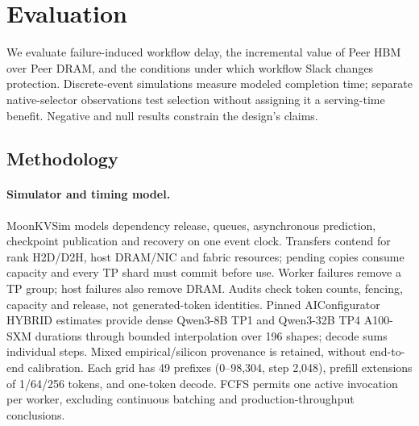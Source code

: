 \section{Evaluation}
\label{sec:evaluation}

We evaluate failure-induced workflow delay, the incremental value of Peer HBM
over Peer DRAM, and the conditions under which workflow Slack changes
protection. Discrete-event simulations measure modeled completion time;
separate native-selector observations test selection without assigning it a
serving-time benefit. Negative and null results constrain the design's claims.

\subsection{Methodology}
\label{sec:eval-method}

\paragraph{Simulator and timing model.}
MoonKVSim models dependency release, queues, asynchronous prediction,
checkpoint publication and recovery on one event clock. Transfers contend for
rank H2D/D2H, host DRAM/NIC and fabric resources; pending copies consume capacity
and every TP shard must commit before use. Worker failures remove a TP group;
host failures also remove DRAM. Audits check token counts, fencing, capacity
and release, not generated-token identities.
Pinned AIConfigurator HYBRID estimates\cite{eval2026aiconfigurator} provide
dense Qwen3-8B TP1 and Qwen3-32B TP4 A100-SXM durations through bounded
interpolation over 196 shapes; decode sums individual steps. Mixed
empirical/silicon provenance is retained, without end-to-end calibration.
Each grid has 49 prefixes (0--98,304, step 2,048), prefill extensions of
1/64/256 tokens, and one-token decode.
FCFS permits one active invocation per worker, excluding continuous batching
and production-throughput conclusions.

